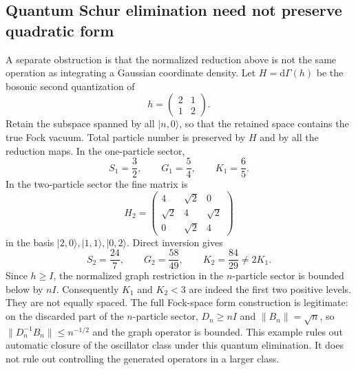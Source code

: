 \subsection{Quantum Schur elimination need not preserve quadratic form}

A separate obstruction is that the normalized reduction above is not
the same operation as integrating a Gaussian coordinate density.
Let $H=\mathrm d\Gamma(h)$ be the bosonic second quantization of
\[
 h=\begin{pmatrix}2&1\\1&2\end{pmatrix}.
\]
Retain the subspace spanned by all $|n,0\rangle$, so that the retained
space contains the true Fock vacuum. Total particle number is preserved
by $H$ and by all the reduction maps. In the one-particle sector,
\[
 S_1=\frac32,\qquad G_1=\frac54,\qquad K_1=\frac65 .
\]
In the two-particle sector the fine matrix is
\[
 H_2=\begin{pmatrix}
 4&\sqrt2&0\\
 \sqrt2&4&\sqrt2\\
 0&\sqrt2&4
 \end{pmatrix}
\]
in the basis $|2,0\rangle,|1,1\rangle,|0,2\rangle$. Direct inversion gives
\[
 S_2=\frac{24}{7},\qquad G_2=\frac{58}{49},
 \qquad K_2=\frac{84}{29}\ne 2K_1.
\]
Since $h\ge I$, the normalized graph restriction in the $n$-particle
sector is bounded below by $nI$. Consequently $K_1$ and $K_2<3$ are
indeed the first two positive levels. They are not equally spaced.
The full Fock-space form construction is legitimate: on the discarded
part of the $n$-particle sector, $D_n\ge nI$ and $\|B_n\|=\sqrt n$,
so $\|D_n^{-1}B_n\|\le n^{-1/2}$ and the graph operator is bounded.
This example rules out automatic closure of the oscillator class under
this quantum elimination. It does not rule out controlling the generated
operators in a larger class.
